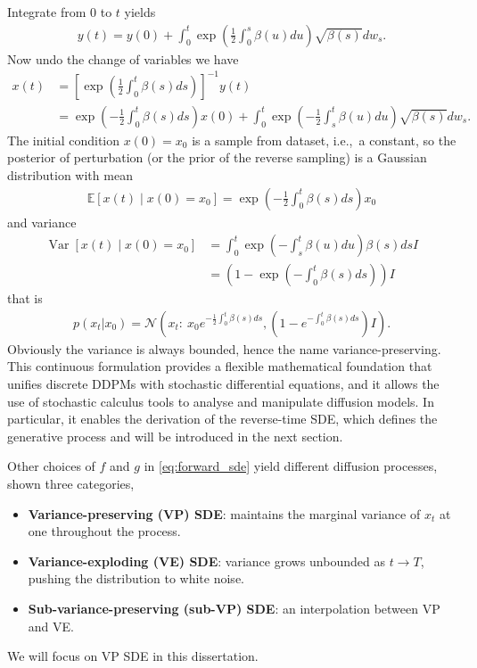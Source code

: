 \documentclass[a4paper,12pt]{article}
\DeclareMathOperator{\Var}{Var} %
\begin{document}
Integrate from \(0\) to \(t\) yields
\begin{align*}
    y\!\left(t\right)=y\!\left(0\right)+\int_0^t\exp\left(\frac{1}{2}\int_0^s\beta\!\left(u\right)du\right)\sqrt{\beta\!\left(s\right)}dw_s.
\end{align*}
Now undo the change of variables we have
\begin{align*}
    x\!\left(t\right)
    &=\left[\exp\left(\frac{1}{2}\int_0^t\beta\!\left(s\right)ds\right)\right]^{-1}y\!\left(t\right)\\
    &=\exp\left(-\frac{1}{2}\int_0^t\beta\!\left(s\right)ds\right)x\!\left(0\right)+\int_0^t\exp\left(-\frac{1}{2}\int_s^t\beta\!\left(u\right)du\right)\sqrt{\beta\!\left(s\right)}dw_s.
\end{align*}
The initial condition \(x\!\left(0\right)=x_0\) is a sample from dataset, i.e.,~a constant, so the posterior of perturbation (or the prior of the reverse sampling) is a Gaussian distribution with mean
\begin{align}\label{eq:VPSDE-solution-mean}
    \mathbb{E}\left[x\!\left(t\right)\mid x\!\left(0\right)=x_0\right]=\exp\left(-\frac{1}{2}\int_0^t\beta\!\left(s\right)ds\right)x_0
\end{align}
and variance
\begin{align}
    \nonumber
    \Var\left[x\!\left(t\right)\mid x\!\left(0\right)=x_0\right]
    &=\int_0^t\exp\left(-\int_s^t\beta\!\left(u\right)du\right)\beta\!\left(s\right)ds I\\
    \label{eq:VPSDE-solution-variance}
    &=\left(1-\exp\left(-\int_0^t\beta\!\left(s\right)ds\right)\right)I
\end{align}
that is
\begin{align}\label{eq:VPSDE-solution}
    p\!\left(x_t|x_0\right)=\mathcal{N}\left(x_t:\:x_0e^{-\frac{1}{2}\int_0^t\beta(s)ds},\left(1-e^{-\int_0^t\beta(s)ds}\right)I\right).
\end{align}
Obviously the variance is always bounded, hence the name variance-preserving. This continuous formulation provides a flexible mathematical foundation that unifies discrete DDPMs with stochastic differential equations, and it allows the use of stochastic calculus tools to analyse and manipulate diffusion models. In particular, it enables the derivation of the reverse-time SDE, which defines the generative process and will be introduced in the next section.

Other choices of \(f\) and \(g\) in \cref{eq:forward_sde} yield different diffusion processes, \citet{song2021ScoreBasedGenerativeModeling} shown three categories,
\begin{itemize}
    \item \textbf{Variance-preserving (VP) SDE}: maintains the marginal variance of \(x_t\) at one throughout the process.  
    \item \textbf{Variance-exploding (VE) SDE}: variance grows unbounded as \(t \to T\), pushing the distribution to white noise.  
    \item \textbf{Sub-variance-preserving (sub-VP) SDE}: an interpolation between VP and VE.  
\end{itemize}
We will focus on VP SDE in this dissertation.
\end{document}
